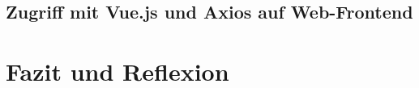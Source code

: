 \documentclass[12pt,oneside,titlepage,listof=totoc,bibliography=totoc]{scrartcl}
\begin{document}
\subsection{Zugriff mit Vue.js und Axios auf Web-Frontend}

\section{Fazit und Reﬂexion}






\end{document}
